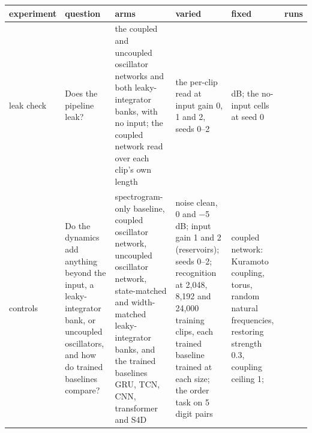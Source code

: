 \documentclass[10pt]{article}
\newcounter{none} %
\begin{document}
{\def\LTcaptype{none} %
\begin{longtable}[]{@{}
  >{\raggedright\arraybackslash}p{}
  >{\raggedright\arraybackslash}p{}
  >{\raggedright\arraybackslash}p{}
  >{\raggedright\arraybackslash}p{}
  >{\raggedright\arraybackslash}p{}
  >{\raggedright\arraybackslash}p{}@{}}
\toprule\noalign{}
\begin{minipage}[b]{\linewidth}\raggedright
experiment
\end{minipage} & \begin{minipage}[b]{\linewidth}\raggedright
question
\end{minipage} & \begin{minipage}[b]{\linewidth}\raggedright
arms
\end{minipage} & \begin{minipage}[b]{\linewidth}\raggedright
varied
\end{minipage} & \begin{minipage}[b]{\linewidth}\raggedright
fixed
\end{minipage} & \begin{minipage}[b]{\linewidth}\raggedright
runs
\end{minipage} \\
\midrule\noalign{}
\endhead
\bottomrule\noalign{}
\endlastfoot
leak check & Does the pipeline leak? & the coupled and uncoupled
oscillator networks and both leaky-integrator banks, with no input; the
coupled network read over each clip's own length & the per-clip read at
input gain 0, 1 and 2, seeds 0--2 & 0 dB; the no-input cells at seed 0 &
13 \\
\cmidrule{1-6}controls & Do the dynamics add anything beyond the input,
a leaky-integrator bank, or uncoupled oscillators, and how do trained
baselines compare? & spectrogram-only baseline, coupled oscillator
network, uncoupled oscillator network, state-matched and width-matched
leaky-integrator banks, and the trained baselines GRU, TCN, CNN,
transformer and S4D & noise clean, 0 and \ensuremath{-}5 dB; input gain
1 and 2 (reservoirs); seeds 0--2; recognition at 2,048, 8,192 and 24,000
training clips, each trained baseline trained at each size; the order
task on 5 digit pairs & coupled network: Kuramoto coupling, torus,
random natural frequencies, restoring strength 0.3, coupling ceiling 1;

\end{longtable}}
\end{document}
